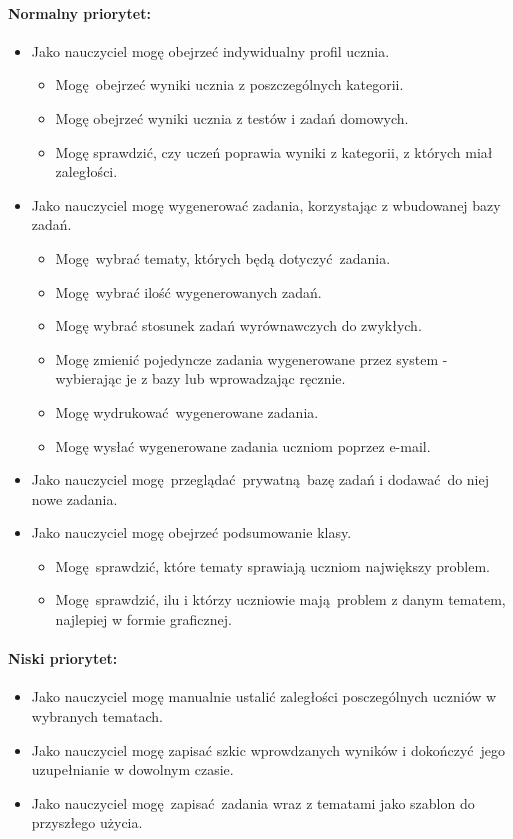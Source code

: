\documentclass[polish,12pt]{aghthesis}
\begin{document}
\paragraph{Normalny priorytet:}
\begin{itemize}
	\item Jako nauczyciel mogę obejrzeć indywidualny profil ucznia.
	\begin{itemize}
		\item Mogę obejrzeć wyniki ucznia z poszczególnych kategorii.
		\item Mogę obejrzeć wyniki ucznia z testów i zadań domowych.
		\item Mogę sprawdzić, czy uczeń poprawia wyniki z kategorii, z których miał zaległości.
	\end{itemize}
	\item Jako nauczyciel mogę wygenerować zadania, korzystając z wbudowanej bazy zadań.
	\begin{itemize}
		\item Mogę wybrać tematy, których będą dotyczyć zadania.
		\item Mogę wybrać ilość wygenerowanych zadań.
		\item Mogę wybrać stosunek zadań wyrównawczych do zwykłych.
		\item Mogę zmienić pojedyncze zadania wygenerowane przez system - wybierając je z bazy lub wprowadzając ręcznie. 
		\item Mogę wydrukować wygenerowane zadania.
		\item Mogę wysłać wygenerowane zadania uczniom poprzez e-mail.
	\end{itemize}
	\item Jako nauczyciel mogę przeglądać prywatną bazę zadań i dodawać do niej nowe zadania.
	\item Jako nauczyciel mogę obejrzeć podsumowanie klasy.
	\begin{itemize}
		\item Mogę sprawdzić, które tematy sprawiają uczniom największy problem.
		\item Mogę sprawdzić, ilu i którzy uczniowie mają problem z danym tematem, najlepiej w formie graficznej.
	\end{itemize}
\end{itemize}

\paragraph{Niski priorytet:}
\begin{itemize}
	\item Jako nauczyciel mogę manualnie ustalić zaległości posczególnych uczniów w wybranych tematach.
	\item Jako nauczyciel mogę zapisać szkic wprowdzanych wyników i dokończyć jego uzupełnianie w dowolnym czasie.
	\item Jako nauczyciel mogę zapisać zadania wraz z tematami jako szablon do przyszłego użycia.
\end{itemize}
\end{document}
